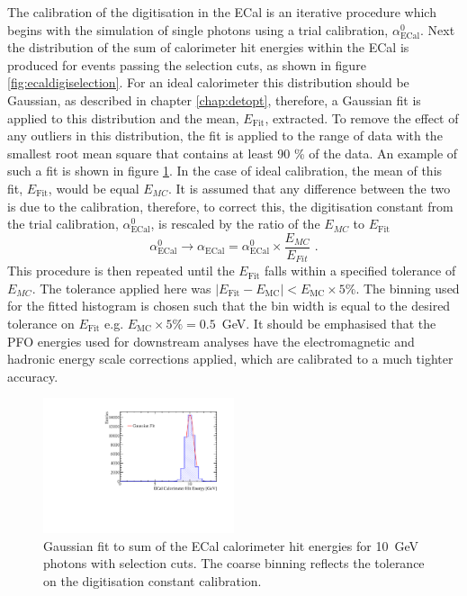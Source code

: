 The calibration of the digitisation in the ECal is an iterative procedure which begins with the simulation of single photons using a trial calibration, $\alpha^{0}_{\text{ECal}}$.  Next the distribution of the sum of calorimeter hit energies within the ECal is produced for events passing the selection cuts, as shown in figure \ref{fig:ecaldigiselection}.  For an ideal calorimeter this distribution should be Gaussian, as described in chapter \ref{chap:detopt}, therefore, a Gaussian fit is applied to this distribution and the mean, $E_{\text{Fit}}$, extracted.  To remove the effect of any outliers in this distribution, the fit is applied to the range of data with the smallest root mean square that contains at least 90 \% of the data.  An example of such a fit is shown in figure \ref{fig:ecaldigifit}.  In the case of ideal calibration, the mean of this fit, $E_{\text{Fit}}$, would be equal $E_{MC}$.  It is assumed that any difference between the two is due to the calibration, therefore, to correct this, the digitisation constant from the trial calibration, $\alpha^{0}_{\text{ECal}}$, is rescaled by the ratio of the $E_{MC}$ to $E_{\text{Fit}}$
%
\begin{equation}
\alpha^{0}_{\text{ECal}} \rightarrow \alpha_{\text{ECal}} = \alpha^{0}_{\text{ECal}} \times \frac{E_{MC}}{E_{Fit}}\text{ .}
\end{equation}
%
This procedure is then repeated until the $E_{\text{Fit}}$ falls within a specified tolerance of $E_{MC}$.  The tolerance applied here was $|E_{\text{Fit}} - E_{\text{MC}}| < E_{\text{MC}} \times 5 \%$.  The binning used for the fitted histogram is chosen such that the bin width is equal to the desired tolerance on $E_{\text{Fit}}$ e.g. $E_{\text{MC}} \times 5 \% = 0.5$~GeV.  It should be emphasised that the PFO energies used for downstream analyses have the electromagnetic and hadronic energy scale corrections applied, which are calibrated to a much tighter accuracy.

\begin{figure}[h!]
\includegraphics[width=0.5\textwidth]{EnergyEstimators/Plots/Calibration/Digitsation/ECal/DigitisationECalFit.pdf}
\caption[Gaussian fit to sum of the ECal calorimeter hit energies for 10~GeV photons with selection cuts.  The coarse binning reflects the tolerance on the digitisation constant calibration.]{Gaussian fit to sum of the ECal calorimeter hit energies for 10~GeV photons with selection cuts.  The coarse binning reflects the tolerance on the digitisation constant calibration.}
\label{fig:ecaldigifit}
\end{figure}

